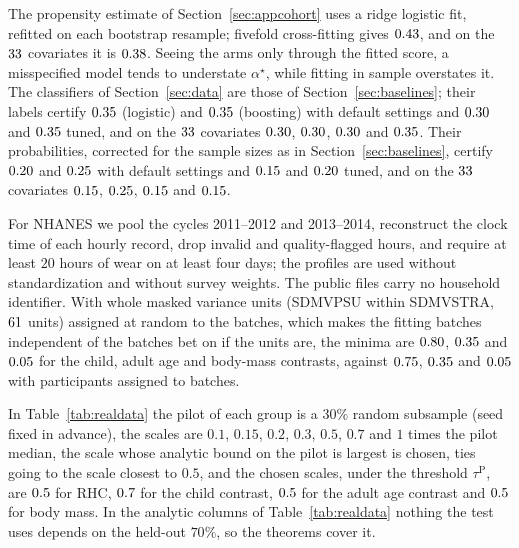 The propensity estimate of Section~\ref{sec:appcohort} uses a ridge logistic fit, refitted on each bootstrap
resample; fivefold cross-fitting gives $0.43$, and on the $33$ covariates it is
$0.38$. Seeing the arms only through the fitted score, a
misspecified model tends to understate $\alpha^\star$, while fitting in sample overstates it. The classifiers of
Section~\ref{sec:data} are those of Section~\ref{sec:baselines}; their labels certify $0.35$
(logistic) and $0.35$ (boosting) with default settings and $0.30$ and
$0.35$ tuned, and on the $33$ covariates $0.30$,
$0.30$, $0.30$ and $0.35$. Their probabilities, corrected
for the sample sizes as in Section~\ref{sec:baselines}, certify $0.20$ and $0.25$
with default settings and $0.15$ and $0.20$ tuned, and on the
$33$ covariates $0.15$, $0.25$, $0.15$ and
$0.15$.

For NHANES \citep{nhanes2012,john2019mims} we pool the cycles 2011--2012 and 2013--2014, reconstruct the
clock time of each hourly record, drop invalid and quality-flagged hours, and require at least $20$ hours of wear on at
least four days; the profiles are used without standardization and without survey weights.
The public files carry no household identifier. With whole masked variance units (SDMVPSU within SDMVSTRA,
$61$ units) assigned at random to the batches, which makes the fitting batches independent of the batches
bet on if the units are, the minima are $0.80$, $0.35$ and $0.05$ for the child, adult age and
body-mass contrasts, against $0.75$, $0.35$ and $0.05$ with participants assigned to batches.

In Table~\ref{tab:realdata} the pilot of each group is a $30\%$ random subsample (seed fixed in advance), the
scales are $0.1$, $0.15$, $0.2$, $0.3$, $0.5$, $0.7$ and $1$ times the pilot median, the scale whose analytic bound on the pilot is largest is chosen, ties going to the scale closest to $0.5$, and the chosen
scales, under the threshold $\tau^{\mathrm P}$, are $0.5$ for RHC, $0.7$ for the child contrast,
$0.5$ for the adult age contrast and $0.5$ for body mass. In the analytic columns of
Table~\ref{tab:realdata} nothing the test uses depends on the held-out $70\%$, so the theorems cover it.


